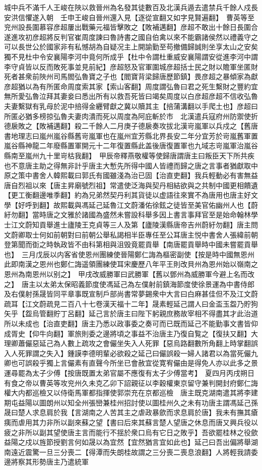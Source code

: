城中兵不滿千人王峻在陜以救晉州為名發其徒數百及北漢兵遁去遣禁兵千餘人戍長安洪信懼遂入朝　壬申王峻自晉州還入見【逐從宣翻又如字見賢遍翻】　曹英等至兖州設長圍慕容彦超屢出戰藥元福皆擊敗之【敗補邁翻】彦超不敢出十餘日長圍合遂進攻初彦超將反判官崔周度諫曰魯詩書之國自伯禽以來不能霸諸侯然以禮義守之可以長世公於國家非有私憾胡為自疑况主上開諭勤至苟撤備歸誠則坐享太山之安矣獨不見杜中令安襄陽李河中竟何所成乎【杜中令謂杜重威安襄陽謂安從進李河中謂李守貞皆以反而敗死事並見前紀】彦超怒及官軍圍城彦超括士民之財以贍軍坐匿財死者甚衆前陜州司馬閻弘魯寶之子也【閻寶背梁歸唐歷節鎮】畏彦超之暴傾家為獻彦超猶以為有所匿命周度索其家【索山客翻】周度謂弘魯曰君之死生繫財之豐約宜無所愛弘魯泣拜其妻妾曰悉出所有以救吾死皆曰竭矣周度以白彦超彦超不信收弘魯夫妻繫獄有乳母於泥中掊得金纒臂獻之冀以贖其主【掊蒲溝翻以手爬土也】彦超曰所匿必猶多榜掠弘魯夫妻肉潰而死以周度為阿庇斬於市　北漢遣兵寇府州防禦使折德扆敗之【敗補邁翻】殺二千餘人二月庚子德扆奏攻拔北漢岢嵐軍以兵戍之【舊唐書地理志曰嵐州嵐谷縣舊岢嵐軍也在嵐州宜芳縣北界長安二年分宜芳於岢嵐舊軍置嵐谷縣神龍二年廢縣置軍開元十二年復置縣此盖後唐復置軍也九域志岢嵐軍治嵐谷縣南至嵐州九十里岢枯我翻】　甲辰帝釋燕敬權等使歸唐謂唐主曰叛臣天下所共疾也不意唐主助之得無非計乎唐主大慙先所得中國人皆禮而歸之唐之言事者猶獻取中原之策中書舍人韓熙載曰郭氏有國雖淺為治已固【治直吏翻】我兵輕動必有害無益唐自烈祖以來【唐主昇廟號烈祖】常遣使泛海與契丹相結欲與之共制中國更相饋遺【更工衡翻邊唯季翻】約為兄弟然契丹利其貨徒以虚語往來實不為唐用也唐主好文學【好呼到翻】故熙載與馮延己延魯江文蔚潘佑徐鉉之徒皆至美官佑幽州人也【蔚紆勿翻】當時唐之文雅於諸國為盛然未嘗設科舉多因上書言事拜官至是始命翰林學士江文蔚知貢舉進士廬陵王克貞等三人及第【廬陵漢縣唐帝吉州蔚紆勿翻】唐主問文蔚卿取士何如前朝對曰前朝公舉私謁相半臣專任至公耳唐主悦中書舍人張緯前朝登第聞而衘之時執政皆不由科第相與沮毁竟罷貢舉【南唐罷貢舉時中國未嘗罷貢舉也】　三月戊辰以内客省使恩州團練使晉陽鄭仁誨為樞密副使【按是時中國無恩州此即南漢之恩州也鄭仁誨遥領團練使耳宋慶歷八年平王則改貝州為恩州始以嶺南之恩州為南恩州以别之】　甲戌改威勝軍曰武勝軍【舊以鄧州為威勝軍今避上名而改之】　唐主以太弟太保昭義節度使馮延己為左僕射前鎮海節度使徐景運為中書侍郎及右僕射孫晟皆同平章事既宣制戶部尚書常夢錫衆中大言曰白麻甚佳但不及江文蔚疏耳【江文蔚疏見二百八十七卷漢天福十二年】晟素輕延己謂人曰金盃玉盌乃貯狗矢乎【盌烏管翻貯丁呂翻】延己言於唐主曰陛下躬親庶務故宰相不得盡其才此治道所以未成也【治直吏翻】唐主乃悉以政事委之奏可而已既而延己不能勤事文書皆仰成胥史【仰牛向翻】軍旅則委之邊將頃之事益不治唐主乃復自覧之【復扶又翻】大理卿蕭儼惡延己為人數上疏攻之會儼坐失入人死罪【惡烏路翻數所角翻上時掌翻誤入人死罪謂之失入】鍾謨李德明輩必欲殺之延己曰儼誤殺一婦人諸君以為當死儼九卿也可誤殺乎獨上言儼素有直聲今所坐已會赦宜從寛宥儼由是得免人亦以此多之景運尋罷為太子少傅【按唐既置太弟官屬不應復有太子少傅當考】　夏四月丙戌朔日有食之帝以曹英等攻兖州久未克乙卯下詔親征以李穀權東京留守兼判開封府鄭仁誨權大内都巡檢又以侍衛馬軍都指揮使郭崇充在京都巡檢　唐主既克湖南遣其將李建期屯益陽以圖朗州以知全州張巒兼桂州招討使以圖桂州久之未有功唐主謂馮延己孫晟曰楚人求息肩於我【言湖南之人苦其主之虐政暴歛而求息肩於唐】我未有撫其瘡痍而虐用其力非所以副來蘇之望【書曰后來其蘇言楚人望唐之休息而唐又興兵役以疲之非所以副其望使唐主言而能行不揺於衆口烏有它日之敗乎】吾欲罷桂林之役歛益陽之戍以旌節授劉言何如晟以為宜然【宜然猶言宜如此也】延己曰吾出偏將舉湖南遠近震驚一旦三分喪二【得潭而失朗桂故謂之三分喪二喪息浪翻】人將輕我請委邊將察其形勢唐主乃遣統軍